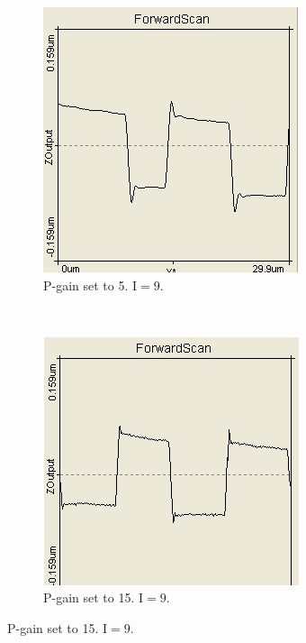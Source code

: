 \documentclass[paper=a4,fontsize=10pt,DIV=18,twocolumn,parskip=half]{scrartcl}
\numberwithin{equation}{section}    %
\begin{document}
\begin{figure}
    \begin{subfigure}{0.45\columnwidth}
        \includegraphics[width=\textwidth]{Bilder/wenigP}
        \caption{P-gain set to 5. 
        $\mathrm{I}=9$.}
        \label{wenigP}
    \end{subfigure}
    ~
    \begin{subfigure}{0.45\columnwidth}
        \includegraphics[width=\textwidth]{Bilder/vielP}
        \caption{P-gain set to 15. 
        $\mathrm{I}=9$.}
        \label{vielP}
    \end{subfigure}
    

\end{figure}
\end{document}
